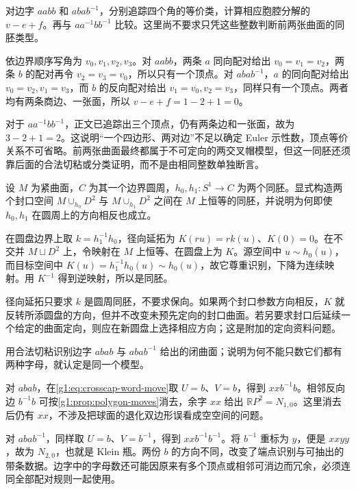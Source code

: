 \begin{exercise}\label{g1:ex:two-letter-polygons}
	对边字 \(aabb\) 和 \(abab^{-1}\)，分别追踪四个角的等价类，计算相应胞腔分解的 \(v-e+f\)。再与 \(aa^{-1}bb^{-1}\) 比较。这里尚不要求只凭这些整数判断前两张曲面的同胚类型。
\end{exercise}
\begin{solution}
	依边界顺序写角为 \(v_0,v_1,v_2,v_3\)。对 \(aabb\)，两条 \(a\) 同向配对给出 \(v_0=v_1=v_2\)，两条 \(b\) 的配对再令 \(v_2=v_3=v_0\)，所以只有一个顶点。对 \(abab^{-1}\)，\(a\) 的同向配对给出 \(v_0=v_2,v_1=v_3\)，而 \(b\) 的反向配对给出 \(v_1=v_0,v_2=v_3\)，同样只有一个顶点。两者均有两条商边、一张面，所以 \(v-e+f=1-2+1=0\)。

	对于 \(aa^{-1}bb^{-1}\)，正文已追踪出三个顶点，仍有两条边和一张面，故为 \(3-2+1=2\)。这说明“一个四边形、两对边”不足以确定 Euler 示性数，顶点等价关系不可省略。前两张曲面最终都属于不可定向的两交叉帽模型，但这一同胚还须靠后面的合法切粘或分类证明，而不是由相同整数单独断言。
\end{solution}

\begin{exercise}\label{g1:ex:capping-parameter}
	设 \(M\) 为紧曲面，\(C\) 为其一个边界圆周，\(h_0,h_1:S^1\to C\) 为两个同胚。显式构造两个封口空间 \(M\cup_{h_0}D^2\) 与 \(M\cup_{h_1}D^2\) 之间在 \(M\) 上恒等的同胚，并说明为何即使 \(h_0,h_1\) 在圆周上的方向相反也成立。
\end{exercise}
\begin{solution}
	在圆盘边界上取 \(k=h_1^{-1}h_0\)，径向延拓为 \(K(ru)=r k(u)\)、\(K(0)=0\)。在不交并 \(M\sqcup D^2\) 上，令映射在 \(M\) 上恒等、在圆盘上为 \(K\)。源空间中 \(u\sim h_0(u)\)，而目标空间中 \(K(u)=h_1^{-1}h_0(u)\sim h_0(u)\)，故它尊重识别，下降为连续映射。用 \(K^{-1}\) 得到逆映射，所以是同胚。

	径向延拓只要求 \(k\) 是圆周同胚，不要求保向。如果两个封口参数方向相反，\(K\) 就反转所添圆盘的方向，但并不改变未预先定向的封口曲面。若另要求封口后延续一个给定的曲面定向，则应在新圆盘上选择相应方向；这是附加的定向资料问题。
\end{solution}

\begin{exercise}
	用合法切粘识别边字 \(abab\) 与 \(aba b^{-1}\) 给出的闭曲面；说明为何不能只数它们都有两种字母，就认定是同一个模型。
\end{exercise}
\begin{solution}
	对 \(abab\)，在\cref{g1:eq:crosscap-word-move}取 \(U=b\)、\(V=b\)，得到 \(xxb^{-1}b\)。相邻反向边 \(b^{-1}b\) 可按\cref{g1:prop:polygon-moves}消去，余字 \(xx\) 给出 \(\mathbb RP^2=N_{1,0}\)。这里消去后仍有 \(xx\)，不涉及把球面的退化双边形误看成空空间的问题。

	对 \(abab^{-1}\)，同样取 \(U=b\)、\(V=b^{-1}\)，得到 \(xxb^{-1}b^{-1}\)。将 \(b^{-1}\) 重标为 \(y\)，便是 \(xxyy\)，故为 \(N_{2,0}\)，也就是 Klein 瓶。两份 \(b\) 的方向不同，改变了端点识别与可抽出的带条数据。边字中的字母数还可能因原来有多个顶点或相邻可消边而冗余，必须连同全部配对规则一起使用。
\end{solution}

